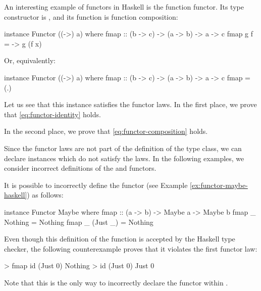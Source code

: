 \begin{example}
  \label{ex:functor-function-haskell}


  An interesting example of functors in Haskell is the function
  functor. Its type constructor is , and its
   function is function composition:
  \begin{codehaskell}
instance Functor ((->) a) where
  fmap :: (b -> c) -> (a -> b) -> a -> c
  fmap g f = \x -> g (f x)
  \end{codehaskell}
  Or, equivalently:
  \begin{codehaskell}
instance Functor ((->) a) where
  fmap :: (b -> c) -> (a -> b) -> a -> c
  fmap = (.)
  \end{codehaskell}
  Let us see that this instance satisfies the functor laws. In the
  first place, we prove that \eqref{eq:functor-identity} holds.
  \begin{steps}
      \eqby{\eqref{eq:category-identity}}
  \end{steps}
  In the second place, we prove that \eqref{eq:functor-composition}
  holds.
  \begin{steps}
      \eqby{\eqref{eq:category-associativity}}
  \end{steps}

\end{example}

Since the functor laws are not part of the definition of the
 type class, we can declare instances which do
not satisfy the laws. In the following examples, we consider incorrect
definitions of the  and \texthaskell{[]} functors.

\begin{example}
  \label{ex:functor-bad-maybe-haskell}

  It is possible to incorrectly define the  functor
  (see Example \ref{ex:functor-maybe-haskell}) as follows:
  \begin{codehaskell}
instance Functor Maybe where
  fmap :: (a -> b) -> Maybe a -> Maybe b
  fmap _ Nothing  = Nothing
  fmap _ (Just _) = Nothing
  \end{codehaskell}
  Even though this definition of the  function is
  accepted by the Haskell type checker, the following counterexample
  proves that it violates the first functor law:
  \begin{codehaskell}
> fmap id (Just 0)
Nothing
> id (Just 0)
Just 0
  \end{codehaskell}
  Note that this is the only way to incorrectly declare the
   functor within \hask.

\end{example}

